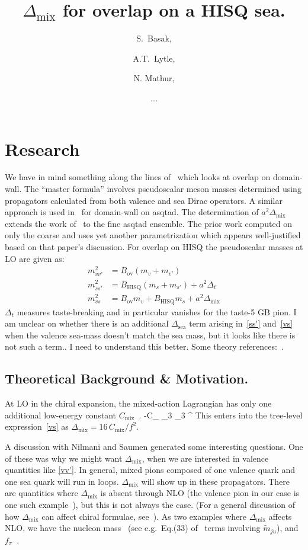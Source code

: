 \documentclass[11pt,a4paper]{article}
\title{\boldmath $\Delta_\text{mix}$ for overlap on a HISQ sea.}
\author{S.\ Basak,}
\author{A.T.\ Lytle,}
\author{N. Mathur,}
\author{...}
\newcommand{\Dmix}[0]{\Delta_{\text{mix}}}
\begin{document}
\maketitle
\section{Research}
We have in mind something along the lines of~\cite{Lujan:2012wg} which looks at overlap
on domain-wall.  The ``master formula'' involves pseudoscalar meson masses determined
using propagators calculated from both valence and sea Dirac operators.
A similar approach is used in~\cite{Aubin:2008wk} for domain-wall on asqtad.
The determination of $a^2 \Dmix$ extends the work of~\cite{Orginos:2007tw} to the fine asqtad ensemble.
The prior work computed on only the coarse and uses yet another parametrization which 
appears well-justified based on that paper's discussion.
For overlap on HISQ the pseudoscalar
masses at LO are given as:
\begin{align}
m^2_{vv'} &= B_{\text{ov}} (m_v + m_{v'}) \label{vv'} \\
m^2_{ss'} &= B_{\text{HISQ}}(m_s + m_{s'}) + a^2 \Delta_{t} \label{ss'}\\
m^2_{vs} &= B_{\text{ov}} m_v + B_{\text{HISQ}} m_s + a^2 \Dmix \label{vs}
\end{align}
$\Delta_t$ measures taste-breaking and in particular vanishes for the taste-5 GB pion.
I am unclear on whether there is an additional $\Delta_{\text{sea}}$ term
arising in~\eqref{ss'} and~\eqref{vs} when the valence sea-mass doesn't match the sea mass,
but it looks like there is not such a term.. I need to understand this better.
Some theory references:~\cite{Aubin:2003mg,Bar:2005tu,Chen:2006wf}.
\subsection{Theoretical Background \& Motivation.}
At LO in the chiral expansion, the mixed-action Lagrangian has only one additional low-energy 
constant $C_\text{mix}$~\cite{Bar:2005tu}.  
\be
{} \ni -C_{} \langle \tau_3 \Sigma \tau_3 \Sigma^\dagger \rangle
\ee
This enters into the tree-level expression~\eqref{vs} as
$\Dmix = 16 \,C_\text{mix}/{f^2}$.

A discussion with Nilmani and Saumen generated some interesting questions.
One of these was why we might want $\Dmix$, when we are interested in valence quantities
like \eqref{vv'}.
In general, mixed pions composed of one valence quark and one sea quark will run in loops.  
$\Dmix$ will show up in these propagators.
There are quantities where $\Dmix$ is absent through NLO 
(the valence pion in our case is one such example~\cite{Chen:2006wf,Bar:2003mh}), 
but this is not always the case. (For a general discussion of how $\Dmix$
can affect chiral formulae, see~\cite{Chen:2007ug}).
As two examples where $\Dmix$ affects NLO, we have the nucleon mass~\cite{Tiburzi:2005is} 
(see e.g.\ Eq.(33) of~\cite{WalkerLoud:2008bp} terms involving $\tilde{m}_{ju}$),
and $f_\pi$~\cite{Bar:2005tu,Chen:2006wf}.
\end{document}
